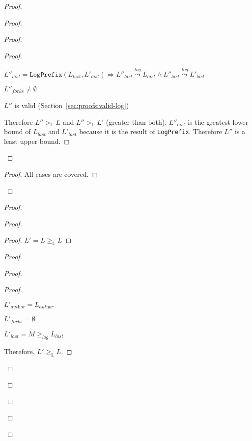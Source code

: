 \documentclass[9pt, oneside]{article}   	%
\newcommand{\logleadsto}{\overset{\textit{log}}\leadsto}
\begin{document}
\begin{proof}
\begin{proof}
\begin{proof}
			\begin{proof}
				\begin{pfenum}
					\item $L''_\textit{last} = \texttt{LogPrefix}(L_\textit{last}, L'_\textit{last}) \Rightarrow  L''_\textit{last} \logleadsto L_\textit{last} \wedge L''_\textit{last} \logleadsto L'_\textit{last} $ 
					\item $L''_\textit{forks} \neq \emptyset$
					\item $L''$ is valid (Section~\ref{sec:proofs:valid-log})
				\end{pfenum}
				Therefore $L'' >_\mathds{L} L$ and $L'' >_\mathds{L} L'$ (greater than both). $L''_\textit{last}$ is the greatest lower bound of $L_\textit{last}$ and $L'_\textit{last}$ because it is the result of \texttt{LogPrefix}. Therefore $L''$ is a least upper bound.
			\end{proof}
		\end{proof}
		\qedstep{}
		\begin{proof}
			All cases are covered.
		\end{proof}
	\end{proof}
	
	\begin{proof}
	
		\begin{proof}
			\begin{proof}
				$L' = L  \geq_\mathds{L} L$
			\end{proof}
			
			\begin{proof}
				\begin{proof}
					\step{}{\case{$L_\textit{last} \logleadsto M$}}
					\begin{proof}
						\begin{pfenum}
							\item $L'_\textit{author} = L_\textit{author}$
							\item $L'_\textit{forks} = \emptyset$
							\item $L'_\textit{last} = M \geq_\textit{log} L_\textit{last}$
						\end{pfenum}
						Therefore, $L' \geq_\mathds{L} L$.
					\end{proof}
					

\end{proof}
\end{proof}
\end{proof}
\end{proof}
\end{proof}
\end{document}
